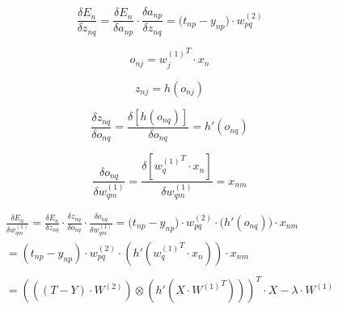 \documentclass[12pt]{article}
\begin{document}
$$
\frac{\delta E_n}{\delta z_{nq}} = \frac{\delta E_n}{\delta a_{np}} \cdot \frac{\delta a_{np}}{\delta z_{nq}} = \big( t_{np} - y_{np} \big) \cdot w_{pq}^{(2)}
$$

$$
o_{nj} = {w_j^{(1)}}^T \cdot x_n 
$$

$$
z_{nj} = h(o_{nj})
$$

$$
\frac{\delta z_{nq}}{\delta o_{nq}} = \frac{\delta [h(o_{nq})]}{\delta o_{nq}} = h'{(o_{nq})}
$$

$$
\frac{\delta o_{nq}}{\delta w_{qm}^{(1)}} = \frac{\delta [{w_q^{(1)}}^T \cdot x_n]}{\delta w_{qm}^{(1)}} = x_{nm}
$$

\begin{multline}
\frac{\delta E_n}{\delta w_{qm}^{(1)}} = \frac{\delta E_n}{\delta z_{nq}} \cdot \frac{\delta z_{nq}}{\delta o_{nq}} \cdot \frac{\delta o_{nq}}{\delta w_{qm}^{(1)}}
= \big( t_{np} - y_{np} \big) \cdot w_{pq}^{(2)} \cdot \big(h'{(o_{nq})}\big) \cdot x_{nm} \\
= \left( t_{np} - y_{np} \right) \cdot w_{pq}^{(2)} \cdot \left(h'{({w_q^{(1)}}^T \cdot x_n)}\right) \cdot x_{nm} \\
\\
= {\left(\left(\left(T - Y\right) \cdot W^{(2)}\right) \otimes \left(h' \left(X \cdot {W^{(1)}}^T\right)\right)\right)}^T \cdot X - \lambda \cdot W^{(1)}
\end{multline}
\end{document}
